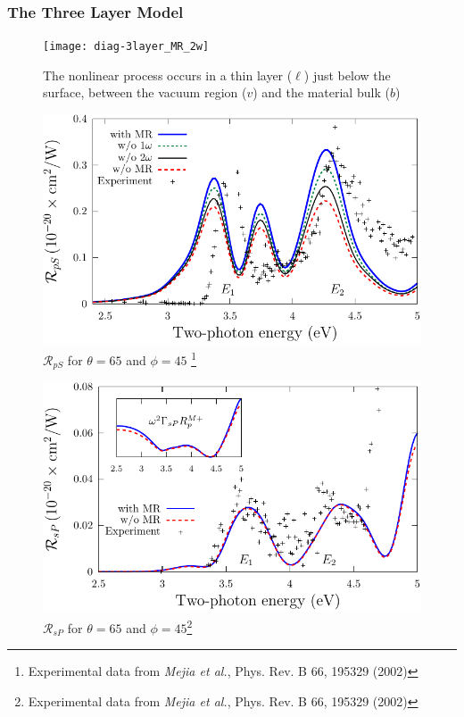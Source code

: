 \documentclass{beamer}
\begin{document}
\begin{frame}
\frametitle{The Three Layer Model}
\begin{figure}
\centering
\texttt{[image: diag-3layer\_MR\_2w]}
\caption{The nonlinear process occurs in a thin layer ($\ell$) just below the
surface, between the vacuum region ($v$) and the material bulk ($b$)}
\end{figure}
\end{frame}

\begin{frame}
\begin{figure}
\centering
\includegraphics[width=\textwidth]{fig-Si1x1-Mejia_RpS}
\caption{$\mathcal{R}_{pS}$ for $\theta=65$ and $\phi=45$
\footnote{Experimental data from \emph{Mejia et al.}, Phys. Rev. B 66, 195329 (2002)}}
\end{figure}
\end{frame}

\begin{frame}
\begin{figure}
\centering
\includegraphics[width=\textwidth]{fig-Si1x1-Mejia_RsP}
\caption{$\mathcal{R}_{sP}$ for $\theta=65$ and $\phi=45$\footnote{Experimental data from \emph{Mejia et al.}, Phys. Rev. B 66, 195329 (2002)}}
\end{figure}
\end{frame}
\end{document}
